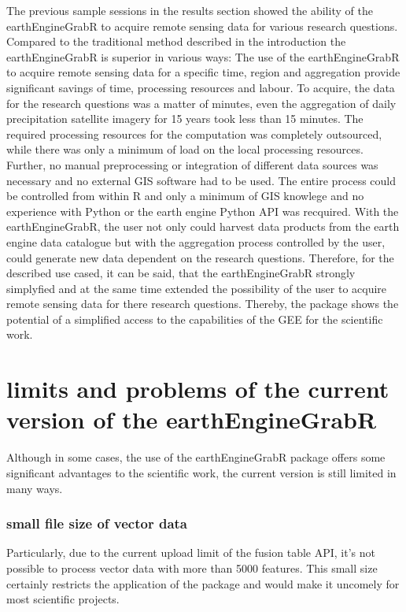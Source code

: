 \documentclass[12pt,twoside,a4paper,final]{report}
\begin{document}
The previous sample sessions in the results section showed the ability of the earthEngineGrabR to acquire remote sensing data for various research questions.
Compared to the traditional method described in the introduction the earthEngineGrabR is superior in various ways:
The use of the earthEngineGrabR to acquire remote sensing data for a specific time, region and aggregation provide significant savings of time, processing resources and labour. To acquire, the data for the research questions was a matter of minutes, even the aggregation of daily precipitation satellite imagery for 15 years took less than 15 minutes. The required processing resources for the computation was completely outsourced, while there was only a minimum of load on the local processing resources. Further, no manual preprocessing or integration of different data sources was necessary and no external GIS software had to be used. The entire process could be controlled from within R and only a minimum of GIS knowlege and no experience with Python or the earth engine Python API was recquired. With the earthEngineGrabR, the user not only could harvest data products from the earth engine data catalogue but with the aggregation process controlled by the user, could generate new data dependent on the research questions. 
Therefore, for the described use cased, it can be said, that the earthEngineGrabR strongly simplyfied and at the same time extended the possibility of the user to acquire remote sensing data for there research questions.
Thereby, the package shows the potential of a simplified access to the capabilities of the GEE for the scientific work.

\section{limits and problems of the current version of the earthEngineGrabR}

Although in some cases, the use of the earthEngineGrabR package offers some significant advantages to the scientific work, the current version is still limited in many ways. 

\subsubsection{small file size of vector data}

Particularly, due to the current upload limit of the fusion table API, it's not possible to process vector data with more than 5000 features. This small size certainly restricts the application of the package and would make it uncomely for most scientific projects. 
 
\end{document}
